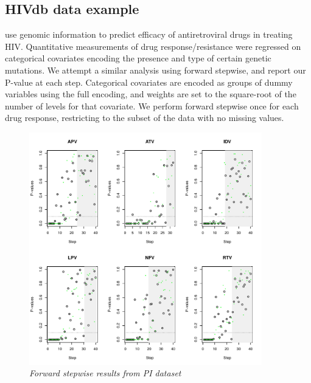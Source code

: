 \documentclass{imsart}
\begin{document}
\subsection{HIVdb data example}
\label{sec:hiv}

\cite{HIV} use genomic information to predict efficacy of antiretroviral
drugs in treating HIV. Quantitative measurements of drug
response/resistance were regressed on categorical covariates encoding
the presence and type of certain genetic mutations. We attempt a similar
analysis using forward stepwise, and report our P-value at each step.
Categorical covariates are encoded as groups of dummy variables using
the full encoding, and weights are set to the square-root of the
number of levels for that covariate. We perform forward stepwise once
for each drug response, restricting to the subset of the data with
no missing values.

\begin{figure}
\begin{center}
\includegraphics[width=0.9\textwidth]{../figs/HIV_PI.pdf}
\caption{\small \it Forward stepwise results from PI dataset}
\label{fig:HIVPI}
\end{center}
\end{figure}
\end{document}
